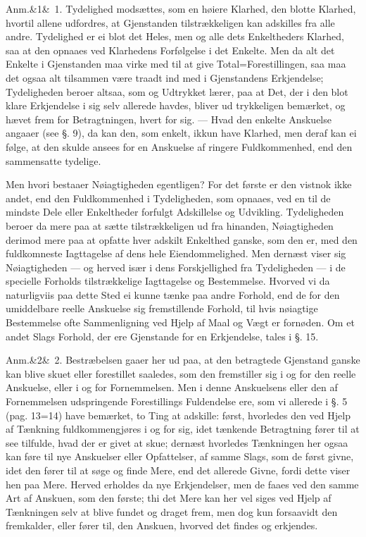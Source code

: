 \documentclass[12pt]{book}
\makeatletter
\def\sperr#1{#1}%
\def\textit#1{#1}%
\def\emph#1{#1}%
\newcommand{\sperr}[1]{\textls[180]{#1}}
\newcommand{\umph}[2][misc]{%
  \@ifundefined{umph@#1@on}{#2}{\emph{#2}}}
\newcommand{\anm}[1]{%
  \par\vspace{0.5\baselineskip}%
  \noindent\hspace{\parindent}\sperr{Anm.}\ifx&#1&\else~\textit{#1}.\fi
  \enspace\ignorespaces
}
\newcommand{\opage}[1]{\marginnote{\footnotesize\textit{[#1]}}}
\makeatother
\begin{document}
\anm{1} \emph{Tydelighed} modsættes, som en høiere \emph{Klarhed}, den blotte
\emph{Klarhed}, hvortil allene udfordres, at Gjenstanden tilstrækkeligen kan
adskilles fra alle andre. \emph{Tydelighed} er ei blot det Heles, men og alle
dets Enkeltheders \emph{Klarhed}, saa at den opnaaes ved \emph{Klarhedens
Forfølgelse} i det Enkelte. Men da alt det Enkelte i Gjenstanden maa virke med
til at give Total=Forestillingen, saa maa det ogsaa alt tilsammen være traadt
ind med i Gjenstandens Erkjendelse; \emph{Tydeligheden} beroer altsaa, som og
Udtrykket lærer, paa at Det, der i den blot klare Erkjendelse i sig selv
allerede havdes, bliver ud%
\opage{33}trykkeligen bemærket, og hævet frem for Betragtningen, hvert for sig. --- Hvad
den enkelte Anskuelse angaaer (see §. 9), da kan den, som enkelt, ikkun have
\emph{Klarhed}, men deraf kan ei følge, at den skulde ansees for en Anskuelse af
ringere Fuldkommenhed, end den sammensatte \emph{tydelige}.

Men hvori bestaaer \emph{Nøiagtigheden} egentligen? For det første er den
vistnok ikke andet, end den Fuldkommenhed i \emph{Tydeligheden}, som opnaaes,
ved en til de mindste Dele eller Enkeltheder forfulgt \emph{Adskillelse og
Udvikling}. \emph{Tydeligheden} beroer da mere paa at sætte tilstrækkeligen ud
fra hinanden, \emph{Nøiagtigheden} derimod mere paa at opfatte hver adskilt
Enkelthed ganske, som den er, med den fuldkomneste Iagttagelse af dens hele
Eiendommelighed. Men dernæst viser sig \emph{Nøiagtigheden} --- og herved især i
dens Forskjellighed fra \emph{Tydeligheden} --- i de specielle Forholds
tilstrækkelige Iagttagelse og Bestemmelse. Hvorved vi da naturligviis paa dette
Sted ei kunne tænke paa andre Forhold, end de for den umiddelbare reelle
Anskuelse sig fremstillende Forhold, til hvis nøiagtige Bestemmelse ofte
Sammenligning ved Hjelp af Maal og Vægt er fornøden. Om et andet Slags Forhold,
der ere Gjenstande for en \umph[schwab]{intellectuel} Erkjendelse, tales i §. 15.

\anm{2} Bestræbelsen gaaer her ud paa, at den betragtede Gjenstand ganske kan
blive skuet eller forestillet saaledes, som den fremstiller sig i og for den
reelle Anskuelse, eller i og for
\opage{34} %
Fornemmelsen. Men i denne Anskuelsens eller den af Fornemmelsen udspringende
Forestillings Fuldendelse ere, som vi allerede i §. 5 (pag. 13=14) have
bemærket, to Ting at adskille: først, hvorledes den ved Hjelp af Tænkning
fuldkommengjøres i og for sig, idet tænkende Betragtning fører til at see
tilfulde, hvad der er givet at skue; dernæst hvorledes Tænkningen her ogsaa kan
føre til nye Anskuelser eller Opfattelser, af samme Slags, som de først givne,
idet den fører til at søge og finde \emph{Mere}, end det allerede Givne, fordi
dette viser hen paa \emph{Mere}. Herved erholdes da nye \emph{Erkjendelser}, men
de faaes ved den samme Art af Anskuen, som den første; thi det \emph{Mere} kan
her vel siges ved Hjelp af Tænkningen selv at blive fundet og draget frem, men
dog kun forsaavidt den fremkalder, eller fører til, den Anskuen, hvorved det
findes og erkjendes.
\end{document}
